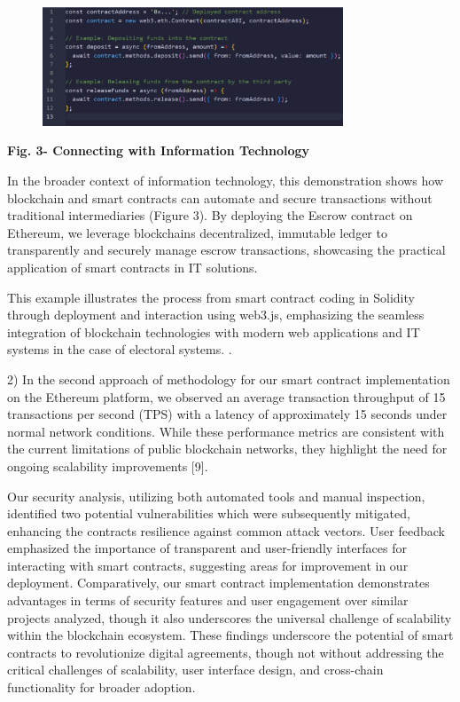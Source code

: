 \begin{figure}[H]
	\centering
	\includegraphics[width=0.8\textwidth]{assets/80}
	\caption*{}
\end{figure}

{\bfseries Fig. 3- Connecting with Information Technology}

In the broader context of information technology, this demonstration
shows how blockchain and smart contracts can automate and secure
transactions without traditional intermediaries (Figure 3). By deploying
the Escrow contract on Ethereum, we leverage
blockchain\textquotesingle s decentralized, immutable ledger to
transparently and securely manage escrow transactions, showcasing the
practical application of smart contracts in IT solutions.

This example illustrates the process from smart contract coding in
Solidity through deployment and interaction using web3.js, emphasizing
the seamless integration of blockchain technologies with modern web
applications and IT systems in the case of electoral systems. .

2) In the second approach of methodology for our smart contract
implementation on the Ethereum platform, we observed an average
transaction throughput of 15 transactions per second (TPS) with a
latency of approximately 15 seconds under normal network conditions.
While these performance metrics are consistent with the current
limitations of public blockchain networks, they highlight the need for
ongoing scalability improvements {[}9{]}.

Our security analysis, utilizing both automated tools and manual
inspection, identified two potential vulnerabilities which were
subsequently mitigated, enhancing the contract\textquotesingle s
resilience against common attack vectors. User feedback emphasized the
importance of transparent and user-friendly interfaces for interacting
with smart contracts, suggesting areas for improvement in our
deployment. Comparatively, our smart contract implementation
demonstrates advantages in terms of security features and user
engagement over similar projects analyzed, though it also underscores
the universal challenge of scalability within the blockchain ecosystem.
These findings underscore the potential of smart contracts to
revolutionize digital agreements, though not without addressing the
critical challenges of scalability, user interface design, and
cross-chain functionality for broader adoption.


